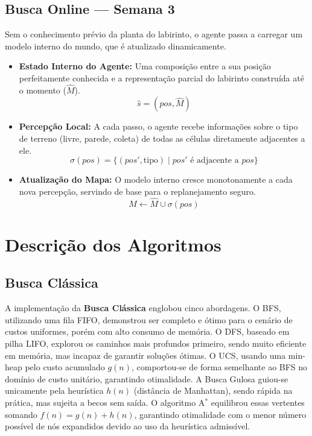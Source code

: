\documentclass[12pt,a4paper]{article}
\begin{document}
\subsection{Busca Online — Semana 3}
Sem o conhecimento prévio da planta do labirinto, o agente passa a carregar um modelo interno do mundo, que é atualizado dinamicamente.
\begin{itemize}
    \item \textbf{Estado Interno do Agente:} Uma composição entre a sua posição perfeitamente conhecida e a representação parcial do labirinto construída até o momento ($\hat{M}$).
    $$\hat{s} = (pos, \hat{M})$$
    \item \textbf{Percepção Local:} A cada passo, o agente recebe informações sobre o tipo de terreno (livre, parede, coleta) de todas as células diretamente adjacentes a ele.
    $$\sigma(pos) = \{ (pos', \text{tipo}) \mid pos' \text{ é adjacente a } pos \}$$
    \item \textbf{Atualização do Mapa:} O modelo interno cresce monotonamente a cada nova percepção, servindo de base para o replanejamento seguro.
    $$\hat{M} \leftarrow \hat{M} \cup \sigma(pos)$$
\end{itemize}

\section{Descrição dos Algoritmos}
\subsection{Busca Clássica}
A implementação da \textbf{Busca Clássica} englobou cinco abordagens. O BFS, utilizando uma fila FIFO, demonstrou ser completo e ótimo para o cenário de custos uniformes, porém com alto consumo de memória. O DFS, baseado em pilha LIFO, explorou os caminhos mais profundos primeiro, sendo muito eficiente em memória, mas incapaz de garantir soluções ótimas. O UCS, usando uma min-heap pelo custo acumulado $g(n)$, comportou-se de forma semelhante ao BFS no domínio de custo unitário, garantindo otimalidade. A Busca Gulosa guiou-se unicamente pela heurística $h(n)$ (distância de Manhattan), sendo rápida na prática, mas sujeita a becos sem saída. O algoritmo A$^*$ equilibrou essas vertentes somando $f(n) = g(n) + h(n)$, garantindo otimalidade com o menor número possível de nós expandidos devido ao uso da heurística admissível.
\end{document}
